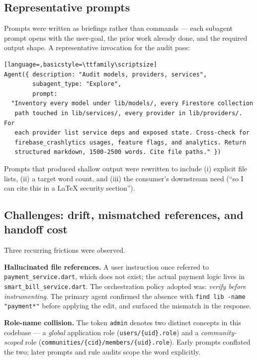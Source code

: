 \documentclass[11pt,a4paper]{article}
\begin{document}
\subsection{Representative prompts}

Prompts were written as briefings rather than commands --- each subagent
prompt opens with the user-goal, the prior work already done, and the required
output shape. A representative invocation for the audit pass:

\begin{lstlisting}[language=,basicstyle=\ttfamily\scriptsize]
Agent({ description: "Audit models, providers, services",
        subagent_type: "Explore",
        prompt:
  "Inventory every model under lib/models/, every Firestore collection
   path touched in lib/services/, every provider in lib/providers/. For
   each provider list service deps and exposed state. Cross-check for
   firebase_crashlytics usages, feature flags, and analytics. Return
   structured markdown, 1500-2500 words. Cite file paths." })
\end{lstlisting}

Prompts that produced shallow output were rewritten to include (i) explicit
file lists, (ii) a target word count, and (iii) the consumer's downstream
need (``so I can cite this in a LaTeX security section'').

\subsection{Challenges: drift, mismatched references, and handoff cost}

Three recurring frictions were observed.

\textbf{Hallucinated file references.} A user instruction once referred to
\texttt{payment\_service.dart}, which does not exist; the actual payment
logic lives in \texttt{smart\_bill\_service.dart}. The orchestration policy
adopted was: \emph{verify before instrumenting}. The primary agent confirmed
the absence with \texttt{find lib -name "payment*"} before applying the
edit, and surfaced the mismatch in the response.

\textbf{Role-name collision.} The token \texttt{admin} denotes two distinct
concepts in this codebase --- a \emph{global} application role
(\texttt{users/\{uid\}.role}) and a \emph{community-scoped} role
(\texttt{communities/\{cid\}/members/\{uid\}.role}). Early prompts conflated
the two; later prompts and rule audits scope the word explicitly.
\end{document}
